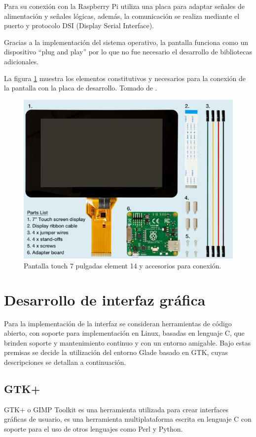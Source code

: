 Para su conexión con la Raspberry Pi utiliza una placa para adaptar señales de alimentación y señales lógicas, además, la comunicación se realiza mediante el puerto y protocolo  DSI (Display Serial Interface).

Gracias a la implementación del sistema operativo, la pantalla funciona como un dispositivo “plug and play” por lo que no fue necesario el desarrollo de bibliotecas adicionales.

La figura \ref{fig:pantalla} muestra los elementos constitutivos y necesarios para la conexión de la pantalla con la placa de desarrollo. Tomado de \citep{ELEPI}.

\begin{figure}[H]
	\centering
	\includegraphics[scale=.5]{./Figures/pantalla.png}
	\caption{Pantalla touch 7 pulgadas element 14 y accesorios para conexión.}
	\label{fig:pantalla}
\end{figure}

\section{Desarrollo de interfaz gráfica}
Para la implementación de la interfaz se consideran herramientas de código abierto, con soporte para implementación en Linux, basadas en lenguaje C, que brinden soporte y mantenimiento continuo y con un entorno amigable. Bajo estas premisas se decide la utilización del entorno Glade basado en GTK, cuyas descripciones se detallan a continuación. 
 \subsection{GTK+}
GTK+ o GIMP Toolkit es una herramienta utilizada para crear interfaces gráficas de usuario, es una herramienta multiplataforma escrita en lenguaje C con soporte para el uso de otros lenguajes como Perl y Python.

